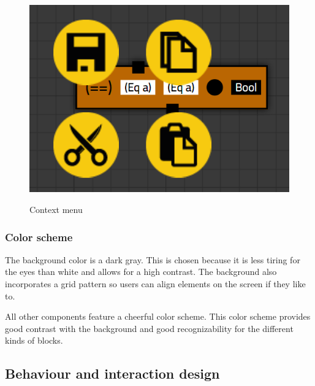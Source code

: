 \begin{figure}[p]
	\centering
	\includegraphics[scale=0.5]{Images/blocks-menu}
	\label{fig:blocks-menu}
	\caption{Context menu}
\end{figure}

\subsubsection{Color scheme}

The background color is a dark gray.
This is chosen because it is less tiring for the eyes than white and allows for a high contrast.
The background also incorporates a grid pattern so users can align elements on the screen if they like to.

All other components feature a cheerful color scheme.
This color scheme provides good contrast with the background and good recognizability for the different kinds of blocks.

\subsection{Behaviour and interaction design}

